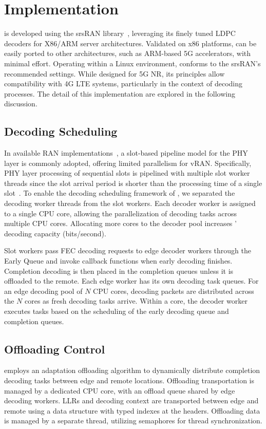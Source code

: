 \section{Implementation}
\Name{} is developed using the srsRAN library~\cite{srsRAN}, leveraging its finely tuned LDPC decoders for X86/ARM server architectures. Validated on x86 platforms, \Name{} can be easily ported to other architectures, such as ARM-based 5G accelerators, with minimal effort. Operating within a Linux environment, \Name{} conforms to the srsRAN’s recommended settings. While designed for 5G NR, its principles allow compatibility with 4G LTE systems, particularly in the context of decoding processes.
The detail of this implementation are explored in the following discussion.


\subsection{Decoding Scheduling}
In available RAN implementations~\cite{OAI,srsRAN}, a slot-based pipeline model for the PHY layer is commonly adopted, offering limited parallelism for vRAN. Specifically, PHY layer processing of sequential slots is pipelined with multiple slot worker threads since the slot arrival period is shorter than the processing time of a single slot~\cite{Nuberu}. To enable the decoding scheduling framework of \Name{}, we separated the decoding worker threads from the slot workers. Each decoder worker is assigned to a single CPU core, allowing the parallelization of decoding tasks across multiple CPU cores. Allocating more cores to the decoder pool increases \Name{}’ decoding capacity (bits/second).

Slot workers pass FEC decoding requests to edge decoder workers through the Early Queue and invoke callback functions when early decoding finishes. Completion decoding is then placed in the completion queues unless it is offloaded to the remote. Each edge worker has its own decoding task queues. For an edge decoding pool of 
$N$ CPU cores, decoding packets are distributed across the 
$N$  cores as fresh decoding tasks arrive. Within a core, the decoder worker executes tasks based on the scheduling of the early decoding queue and completion queues.

\subsection{Offloading Control}
\Name{} employs an adaptation offloading algorithm to dynamically distribute completion decoding tasks between edge and remote locations. Offloading transportation is managed by a dedicated CPU core, with an offload queue shared by edge decoding workers. LLRs and decoding context are transported between edge and remote using a data structure with typed indexes at the headers. Offloading data is managed by a separate thread, utilizing semaphores for thread synchronization.



